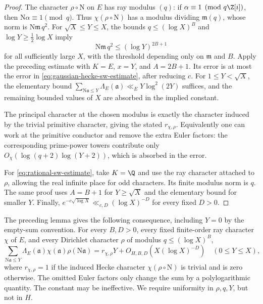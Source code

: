 \begin{proof}
The character $\rho\circ\mathrm N$ on $E$ has ray modulus $(q)$:
if $\alpha\equiv1\pmod{q\Z[i]}$, then
$\mathrm N\alpha\equiv1\pmod q$.
Thus $\chi(\rho\circ\mathrm N)$ has a modulus dividing
$\mathfrak m(q)$, whose norm is $\mathrm N\mathfrak m\,q^2$.
For $\sqrt X\leq Y\leq X$, the bounds
$q\leq(\log X)^B$ and $\log Y\geq\frac12\log X$ imply
\[
 \mathrm N\mathfrak m\,q^2\leq(\log Y)^{2B+1}
\]
for all sufficiently large $X$, with the threshold depending only
on $\mathfrak m$ and $B$.
Apply the preceding estimate with $K=E$, $x=Y$, and $A=2B+1$.
Its error is at most the error in
\eqref{eq:gaussian-hecke-sw-estimate}, after reducing $c$.
For $1\leq Y<\sqrt X$, the elementary bound
$\sum_{\mathrm N\mathfrak a\leq Y}\Lambda_E(\mathfrak a)
\ll_E Y\log^2(2Y)$ suffices, and the remaining bounded values of
$X$ are absorbed in the implied constant.

The principal character at the chosen modulus is exactly the
character induced by the trivial primitive character, giving the
stated $r_{\chi,\rho}$.
Equivalently one can work at the primitive conductor and remove
the extra Euler factors: the corresponding prime-power towers
contribute only
$O_\chi(\log(q+2)\log(Y+2))$, which is absorbed in the error.

For \eqref{eq:rational-sw-estimate}, take $K=\Q$ and use the ray
character attached to $\rho$, allowing the real infinite place
for odd characters.  Its finite modulus norm is $q$.
The same proof uses $A=B+1$ for $Y\geq\sqrt X$ and the elementary
bound for smaller $Y$.  Finally,
$e^{-c\sqrt{\log X}}\ll_{c,D}(\log X)^{-D}$ for every fixed $D>0$.
\end{proof}


The preceding lemma gives the following consequence, including $Y=0$ by the empty-sum convention.
  For every $B,D>0$, every fixed finite-order
ray character $\chi$ of $E$, and every Dirichlet character $\rho$ of
modulus $q\leq(\log X)^B$,
\begin{equation}\label{eq:gaussian-hecke-sw-input}
 \sum_{\mathrm N\mathfrak a\leq Y}
       \Lambda_E(\mathfrak a)\chi(\mathfrak a)
                         \rho(\mathrm N\mathfrak a)
  = r_{\chi,\rho}Y+O_{H,B,D}(X(\log X)^{-D})
 \quad(0\leq Y\leq X),
\end{equation}
where $r_{\chi,\rho}=1$ if the induced Hecke character
$\chi(\rho\circ\mathrm N)$ is trivial and is zero otherwise.
The omitted Euler factors only change the sum by a polylogarithmic
quantity.  The constant may be ineffective.  We require uniformity in
$\rho,q,Y$, but not in $H$.

